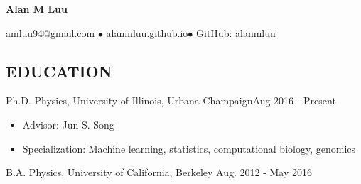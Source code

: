 \documentclass{res}
\newcommand{\rfill}{\hspace*{\fill}}
\begin{document}
\raggedright
\centerline{\LARGE \textbf{Alan M Luu}}
\vspace{-10pt}
\noindent %
\centerline{ \href{mailto:amluu94@gmail.com}{amluu94@gmail.com} $\bullet$
\href{http://alanmluu.github.io}{alanmluu.github.io}$\bullet$
 GitHub: \href{https://github.com/alanmluu}{alanmluu}}
\vspace{1pt}
 \vspace{5pt}
\begin{resume}
\vspace{-30pt}
\section{EDUCATION}
\vspace{5pt}Ph.D. Physics, University of Illinois, Urbana-Champaign\rfill Aug 2016 - Present
\vspace{2pt}
\begin{itemize}
\item Advisor: Jun S. Song
\item Specialization: Machine learning, statistics, computational biology, genomics
\end{itemize}
\vspace{-8pt}B.A. Physics, University of California, Berkeley \rfill Aug. 2012 - May 2016
\vspace{-2pt}

\end{resume}
\end{document}
